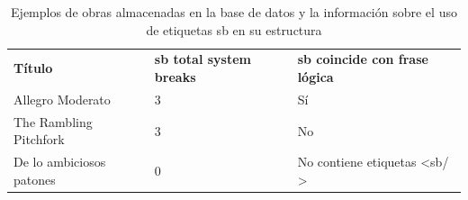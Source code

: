 \begin{table}[H]
\centering
\begin{tabular}{l p{4cm} p{4cm}}
\textbf{Título} & \textbf{sb total system breaks} & \textbf{sb coincide con frase lógica} \\
Allegro Moderato & 3 & Sí \\
The Rambling Pitchfork & 3 & No \\
De lo ambiciosos patones & 0 & No contiene etiquetas <sb/ > \\
\end{tabular}
\caption{Ejemplos de obras almacenadas en la base de datos y la información sobre el uso de etiquetas sb en su estructura}
\end{table}


